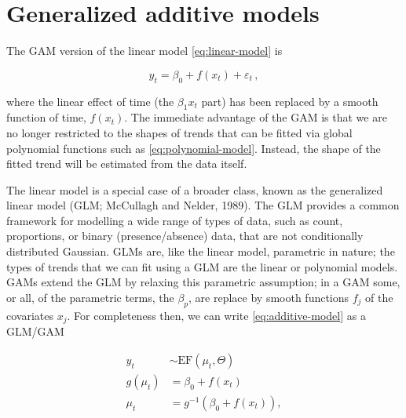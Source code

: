 \documentclass[12pt,]{article}
\begin{document}
\section{Generalized additive models}\label{generalized-additive-models}

The GAM version of the linear model \eqref{eq:linear-model} is

\begin{equation} \label{eq:additive-model}
y_t = \beta_0 + f(x_t) + \varepsilon_t \, ,
\end{equation}

where the linear effect of time (the \(\beta_1 x_t\) part) has been
replaced by a smooth function of time, \(f(x_t)\). The immediate
advantage of the GAM is that we are no longer restricted to the shapes
of trends that can be fitted via global polynomial functions such as
\eqref{eq:polynomial-model}. Instead, the shape of the fitted trend will
be estimated from the data itself.

The linear model is a special case of a broader class, known as the
generalized linear model (GLM; McCullagh and Nelder, 1989). The GLM
provides a common framework for modelling a wide range of types of data,
such as count, proportions, or binary (presence/absence) data, that are
not conditionally distributed Gaussian. GLMs are, like the linear model,
parametric in nature; the types of trends that we can fit using a GLM
are the linear or polynomial models. GAMs extend the GLM by relaxing
this parametric assumption; in a GAM some, or all, of the parametric
terms, the \(\beta_p\), are replace by smooth functions \(f_j\) of the
covariates \(x_j\). For completeness then, we can write
\eqref{eq:additive-model} as a GLM/GAM

\begin{subequations}
\label{eq:gam}
\begin{align}
y_t &\sim \text{EF}(\mu_t, \Theta) \label{eq:gam-ef} \\
g(\mu_t) &= \beta_0 + f(x_t) \label{eq:gam-linear-pred} \\
\mu_t    &= g^{-1}(\beta_0 + f(x_t)), \label{eq:gam-inverse} 
\end{align}
\end{subequations}
\end{document}
